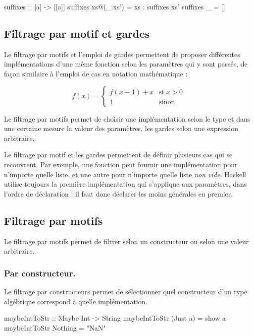 \begin{haskellcode}
suffixes :: [a] -> [[a]]
suffixes xs@(_:xs') = xs : suffixes xs'
suffixes _ = []
\end{haskellcode}

\subsection{Filtrage par motif et gardes}

Le filtrage par motifs et l'emploi de gardes permettent de proposer différentes implémentations d'une même fonction selon les paramètres qui y sont passés, de façon similaire à l'emploi de cas en notation mathématique :

\[
 f(x) =
  \begin{cases}
   f(x-1) + x & \text{si } x > 0 \\
   1          & \text{sinon}
  \end{cases}
\]

Le filtrage par motifs permet de choisir une implémentation selon le type et dans une certaine mesure la valeur des paramètres, les gardes selon une expression arbitraire.

\begin{infobox}
Le filtrage par motif et les gardes permettent de définir plusieurs cas qui se recouvrent. Par exemple, une fonction peut fournir une implémentation pour n'importe quelle liste, et une autre pour n'importe quelle liste \emph{non vide}. Haskell utilise toujours la première implémentation qui s'applique aux paramètres, dans l'ordre de déclaration : il faut donc déclarer les moins générales en premier.
\end{infobox}

\subsection{Filtrage par motifs}
\label{pattern-matching}

Le filtrage par motifs permet de filtrer selon un constructeur ou selon une valeur arbitraire.

\subsubsection{Par constructeur.} Le filtrage par constructeurs permet de sélectionner quel constructeur d'un type algébrique  correspond à quelle implémentation.

\begin{haskellcode}
maybeIntToStr :: Maybe Int -> String
maybeIntToStr (Just a) = show a
maybeIntToStr Nothing  = "NaN"
\end{haskellcode}

